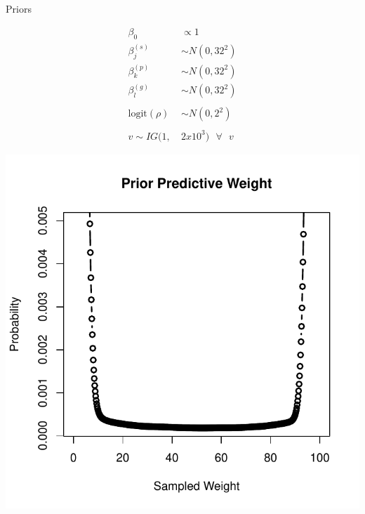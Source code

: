 \documentclass[ xcolor = pdftex, dvipsnames, table ]{beamer}
\begin{document}
\subsection{}
\begin{frame}{Priors}
$~$
\hspace*{-1.5cm}
\begin{minipage}{0.55\textwidth}
\begin{align*}
\beta_0 &\propto 1\\
\beta^{(s)}_j &\sim N(0, 32^2)\\
\beta^{(p)}_k &\sim N(0, 32^2)\\
\beta^{(g)}_l &\sim N(0, 32^2)\\
&\\
\text{logit}(\rho) &\sim N(0, 2^2)\\
&\\
v\sim IG(1,~&2x10^{3}) ~~~\forall~~~v 
\end{align*}
\end{minipage}
\begin{minipage}{0.4\textwidth}
\includegraphics[width=1.4\textwidth]{pictures/priorPredict.pdf}
\end{minipage}
\end{frame}

%
%
\end{document}

